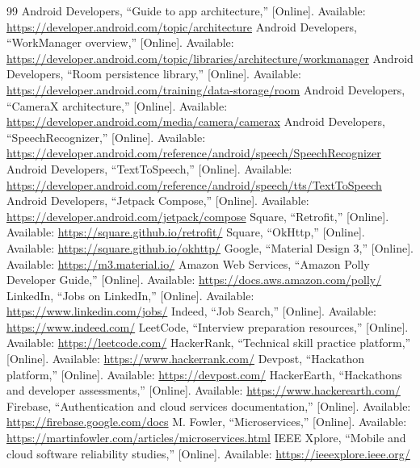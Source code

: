 \documentclass[conference]{IEEEtran}
\begin{document}
\FloatBarrier
{}
\begin{thebibliography}{99}
\small
\setlength{\itemsep}{0pt}
\setlength{\parskip}{0pt}
\setlength{\parsep}{0pt}
 Android Developers, ``Guide to app architecture,'' [Online]. Available: \url{https://developer.android.com/topic/architecture}
 Android Developers, ``WorkManager overview,'' [Online]. Available: \url{https://developer.android.com/topic/libraries/architecture/workmanager}
 Android Developers, ``Room persistence library,'' [Online]. Available: \url{https://developer.android.com/training/data-storage/room}
 Android Developers, ``CameraX architecture,'' [Online]. Available: \url{https://developer.android.com/media/camera/camerax}
 Android Developers, ``SpeechRecognizer,'' [Online]. Available: \url{https://developer.android.com/reference/android/speech/SpeechRecognizer}
 Android Developers, ``TextToSpeech,'' [Online]. Available: \url{https://developer.android.com/reference/android/speech/tts/TextToSpeech}
 Android Developers, ``Jetpack Compose,'' [Online]. Available: \url{https://developer.android.com/jetpack/compose}
 Square, ``Retrofit,'' [Online]. Available: \url{https://square.github.io/retrofit/}
 Square, ``OkHttp,'' [Online]. Available: \url{https://square.github.io/okhttp/}
 Google, ``Material Design 3,'' [Online]. Available: \url{https://m3.material.io/}
 Amazon Web Services, ``Amazon Polly Developer Guide,'' [Online]. Available: \url{https://docs.aws.amazon.com/polly/}
 LinkedIn, ``Jobs on LinkedIn,'' [Online]. Available: \url{https://www.linkedin.com/jobs/}
 Indeed, ``Job Search,'' [Online]. Available: \url{https://www.indeed.com/}
 LeetCode, ``Interview preparation resources,'' [Online]. Available: \url{https://leetcode.com/}
 HackerRank, ``Technical skill practice platform,'' [Online]. Available: \url{https://www.hackerrank.com/}
 Devpost, ``Hackathon platform,'' [Online]. Available: \url{https://devpost.com/}
 HackerEarth, ``Hackathons and developer assessments,'' [Online]. Available: \url{https://www.hackerearth.com/}
 Firebase, ``Authentication and cloud services documentation,'' [Online]. Available: \url{https://firebase.google.com/docs}
 M. Fowler, ``Microservices,'' [Online]. Available: \url{https://martinfowler.com/articles/microservices.html}
 IEEE Xplore, ``Mobile and cloud software reliability studies,'' [Online]. Available: \url{https://ieeexplore.ieee.org/}

\end{thebibliography}
\end{document}

